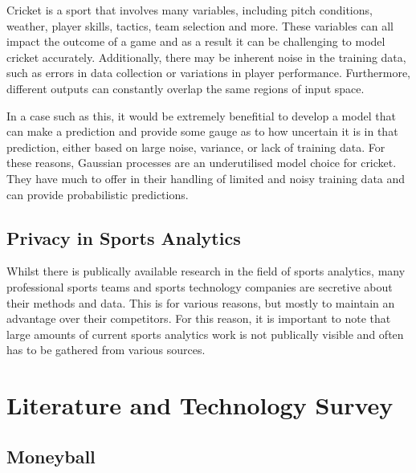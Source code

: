 \documentclass[12pt,a4paper]{report}
\theoremstyle{definition}
\begin{document}
Cricket is a sport that involves many variables, including pitch conditions, weather, player skills, tactics, team selection and more.
These variables can all impact the outcome of a game and as a result it can be challenging to model cricket accurately. 
Additionally, there may be inherent noise in the training data, such as errors in data collection or variations in player performance.
Furthermore, different outputs can constantly overlap the same regions of input space.

In a case such as this, it would be extremely benefitial to develop a model that can make a prediction and provide some gauge as to how uncertain it is in that prediction, either based on large noise, variance, or lack of training data.
For these reasons, Gaussian processes are an underutilised model choice for cricket. 
They have much to offer in their handling of limited and noisy training data and can provide probabilistic predictions.

\section{Privacy in Sports Analytics}

Whilst there is publically available research in the field of sports analytics, many professional sports teams and sports technology companies are secretive about their methods and data. 
This is for various reasons, but mostly to maintain an advantage over their competitors.
For this reason, it is important to note that large amounts of current sports analytics work is not publically visible and often has to be gathered from various sources.

\chapter{Literature and Technology Survey} \label{chap:LitReview}

\section{Moneyball}
\end{document}
